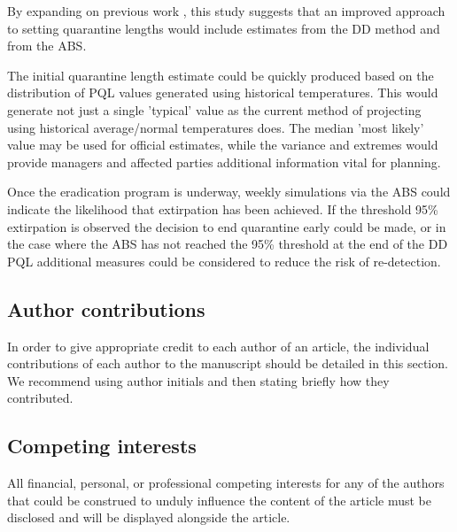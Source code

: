 \documentclass[10pt,a4paper,twocolumn]{article}
\begin{document}

By expanding on previous work \cite{manoukis_agent-based_2014}, this study suggests that an 
improved approach to setting quarantine lengths would 
include estimates from the DD method and from the ABS.

The initial quarantine length estimate could be quickly produced based on the distribution of PQL values
generated using historical temperatures.
This would generate not just a single 'typical' value as the current method of projecting
using historical average/normal temperatures does.
The median 'most likely' value may be used for official estimates, while
the variance and extremes would provide managers and affected parties additional
information vital for planning.



Once the eradication program is underway, weekly simulations
via the ABS could indicate the likelihood that extirpation has been achieved. If the threshold 
95\% extirpation is observed the decision to end quarantine early could be made, or in the case 
where the ABS has not reached the 95\% threshold at the end of the DD PQL additional measures could 
be considered to reduce the risk of re-detection.


%


\subsection*{Author contributions}
In order to give appropriate credit to each author of an article, the individual
contributions of each author to the manuscript should be detailed in this section. We
recommend using author initials and then stating briefly how they contributed.

\subsection*{Competing interests}
All financial, personal, or professional competing interests for any of the authors that
could be construed to unduly influence the content of the article must be disclosed and
will be displayed alongside the article.
\end{document}
